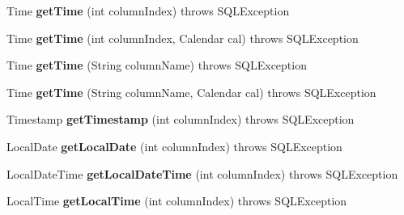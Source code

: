 \begin{DoxyCompactItemize}
Time {\bfseries get\+Time} (int column\+Index)  throws S\+Q\+L\+Exception 
\item 
\mbox{\label{classcom_1_1mysql_1_1cj_1_1jdbc_1_1result_1_1_result_set_impl_a72f2cba14d26d3bba4c0c7555b083275}} 
Time {\bfseries get\+Time} (int column\+Index, Calendar cal)  throws S\+Q\+L\+Exception 
\item 
\mbox{\label{classcom_1_1mysql_1_1cj_1_1jdbc_1_1result_1_1_result_set_impl_a3f38ba7ca058ce41f888de8959e0e5aa}} 
Time {\bfseries get\+Time} (String column\+Name)  throws S\+Q\+L\+Exception 
\item 
\mbox{\label{classcom_1_1mysql_1_1cj_1_1jdbc_1_1result_1_1_result_set_impl_a481950c62fdad863bbb0abfb2715cc29}} 
Time {\bfseries get\+Time} (String column\+Name, Calendar cal)  throws S\+Q\+L\+Exception 
\item 
\mbox{\label{classcom_1_1mysql_1_1cj_1_1jdbc_1_1result_1_1_result_set_impl_a887cf243fad3270569d937e9c96ea91f}} 
Timestamp {\bfseries get\+Timestamp} (int column\+Index)  throws S\+Q\+L\+Exception 
\item 
\mbox{\label{classcom_1_1mysql_1_1cj_1_1jdbc_1_1result_1_1_result_set_impl_a3f3de9c00d4b6f4c3112b70d2ef65637}} 
Local\+Date {\bfseries get\+Local\+Date} (int column\+Index)  throws S\+Q\+L\+Exception 
\item 
\mbox{\label{classcom_1_1mysql_1_1cj_1_1jdbc_1_1result_1_1_result_set_impl_a0d1a0476e11c16e89bad7d1579180f94}} 
Local\+Date\+Time {\bfseries get\+Local\+Date\+Time} (int column\+Index)  throws S\+Q\+L\+Exception 
\item 
\mbox{\label{classcom_1_1mysql_1_1cj_1_1jdbc_1_1result_1_1_result_set_impl_a7648426a041ffc9d73c5cfc2e2e29892}} 
Local\+Time {\bfseries get\+Local\+Time} (int column\+Index)  throws S\+Q\+L\+Exception 
\item 

\end{DoxyCompactItemize}
